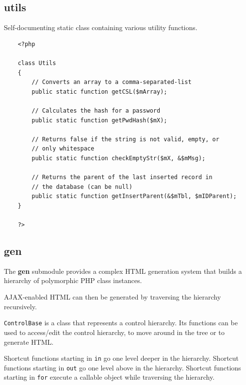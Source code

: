 \documentclass[12pt]{report}
\renewcommand\emph{\textbf}
\begin{document}
                \subsection{utils}

                    Self-documenting static class containing various utility functions.

                    \begin{verbatim}
    <?php

    class Utils
    {
        // Converts an array to a comma-separated-list
        public static function getCSL($mArray);

        // Calculates the hash for a password
        public static function getPwdHash($mX);

        // Returns false if the string is not valid, empty, or
        // only whitespace
        public static function checkEmptyStr($mX, &$mMsg);

        // Returns the parent of the last inserted record in
        // the database (can be null)
        public static function getInsertParent(&$mTbl, $mIDParent);
    }

    ?>
                    \end{verbatim}                

                \subsection{gen}

                    The \emph{gen} submodule provides a complex HTML generation system that builds a hierarchy of polymorphic PHP class instances.

                    AJAX-enabled HTML can then be generated by traversing the hierarchy recursively.

                    \texttt{ControlBase} is a class that represents a control hierarchy. Its functions can be used to access/edit the control hierarchy, to move around in the tree or to generate HTML.

                    Shortcut functions starting in \texttt{in} go one level deeper in the hierarchy.
                    Shortcut functions starting in \texttt{out} go one level above in the hierarchy.
                    Shortcut functions starting in \texttt{for} execute a callable object while traversing the hierarchy.
\end{document}

